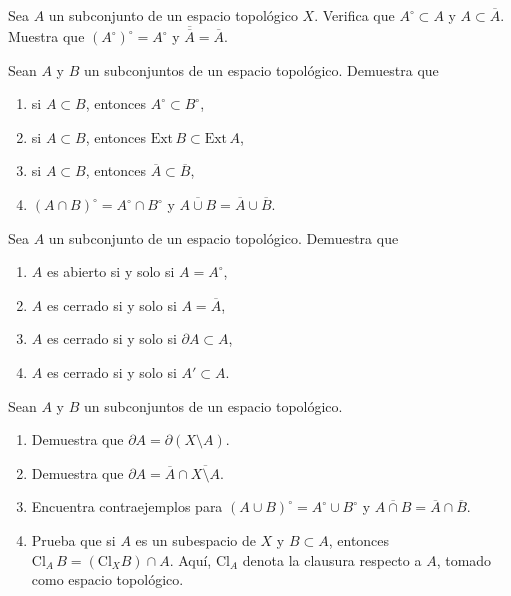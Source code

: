 \documentclass[b5paper,10pt,twoside]{book}
\begin{document}
\begin{problem}
    Sea \(A\)  un subconjunto  de un espacio topológico \(X\).
    Verifica que \(A^\circ \subset A\) y \(A\subset \overline{A}\).
    Muestra que \((A^\circ)^\circ = A^\circ\) y \(\overline{\overline{A}} = \overline{A}\). 

\end{problem}


\begin{problem}
    Sean \(A\) y \(B\) un subconjuntos de un espacio topológico.
    Demuestra que 
    \begin{enumerate}[label=(\roman*)]
        \item si \(A\subset B\), entonces \(A^\circ \subset B^\circ\),
        \item si \(A\subset B\), entonces \(\text{Ext}\, {B} \subset \text{Ext}\, {A}\),
        \item si \(A\subset B\), entonces \(\overline{A} \subset \overline{B}\),
        \item \((A\cap B)^\circ  = A^\circ \cap B^\circ \) y \(\overline{A\cup B}=\overline{A}\cup \overline{B}\).
    \end{enumerate}
\end{problem}
    

\begin{problem}
Sea \(A\) un subconjunto de un espacio topológico.
Demuestra que 
\begin{enumerate}[label=(\roman*)]
    \item \(A\) es abierto si y solo si \(A = A^\circ\),
    \item \(A\) es cerrado si y solo si \(A = \overline{A}\),
    \item \(A\) es cerrado si y solo si \(\partial A \subset  {A}\),
    \item \(A\) es cerrado si y solo si \( A' \subset  {A}\).
\end{enumerate}
\end{problem}


\begin{problem} 
    Sean \(A\) y \(B\) un subconjuntos de un espacio topológico.
\begin{enumerate}[label=(\roman*)]
    \item Demuestra que \(\partial A = \partial (X\setminus A)\).
    \item Demuestra que \(\partial A = \overline{A}\cap \overline{X\setminus A}   \).
    \item Encuentra contraejemplos para \((A\cup  B)^\circ  = A^\circ \cup  B^\circ \) y \(\overline{A\cap B}=\overline{A}\cap \overline{B}\).
    \item Prueba que si \(A\) es un subespacio de \(X\) y \(B\subset A\), entonces \(\text{Cl}_A \, B = (\text{Cl}_X B)\cap A\).
    Aquí, \(\text{Cl}_A\) denota la clausura respecto a \(A\), tomado como espacio topológico.
\end{enumerate}
\end{problem}
\end{document}
